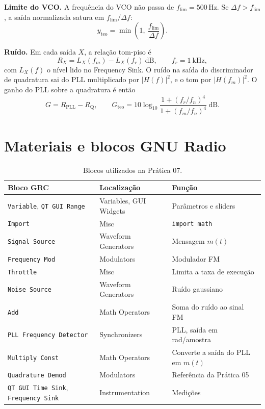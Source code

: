 \documentclass[11pt,a4paper]{article}
\begin{document}
\textbf{Limite do VCO.} A frequência do VCO não passa de
$f_\text{lim} = 500$\,Hz. Se $\Delta f > f_\text{lim}$, a saída normalizada
satura em $f_\text{lim}/\Delta f$:
\begin{equation}
  y_\text{teo} = \min\!\left(1,\ \frac{f_\text{lim}}{\Delta f}\right).
  \label{eq:sat}
\end{equation}

\textbf{Ruído.} Em cada saída $X$, a relação tom-piso é
\begin{equation}
  R_X = L_X(f_m) - L_X(f_r)\ \text{dB}, \qquad f_r = 1\ \text{kHz},
  \label{eq:R}
\end{equation}
com $L_X(f)$ o nível lido no Frequency Sink. O ruído na saída do discriminador
de quadratura sai do PLL multiplicado por $|H(f)|^2$, e o tom por $|H(f_m)|^2$.
O ganho do PLL sobre a quadratura é então
\begin{equation}
  G = R_\text{PLL} - R_\text{Q}, \qquad
  G_\text{teo} = 10\log_{10}\frac{1 + (f_r/f_n)^4}{1 + (f_m/f_n)^4}\ \text{dB}.
  \label{eq:G}
\end{equation}

\section{Materiais e blocos GNU Radio}

\begin{table}[H]
  \centering\small
  \begin{tabular}{l l l}
    \toprule
    \textbf{Bloco GRC} & \textbf{Localização} & \textbf{Função} \\
    \midrule
    \texttt{Variable}, \texttt{QT GUI Range} & Variables, GUI Widgets & Parâmetros e sliders \\
    \texttt{Import}                  & Misc                & \texttt{import math} \\
    \texttt{Signal Source}           & Waveform Generators & Mensagem $m(t)$ \\
    \texttt{Frequency Mod}           & Modulators          & Modulador FM \\
    \texttt{Throttle}                & Misc                & Limita a taxa de execução \\
    \texttt{Noise Source}            & Waveform Generators & Ruído gaussiano \\
    \texttt{Add}                     & Math Operators      & Soma do ruído ao sinal FM \\
    \texttt{PLL Frequency Detector}  & Synchronizers       & PLL, saída em rad/amostra \\
    \texttt{Multiply Const}          & Math Operators      & Converte a saída do PLL em $m(t)$ \\
    \texttt{Quadrature Demod}        & Modulators          & Referência da Prática 05 \\
    \texttt{QT GUI Time Sink}, \texttt{Frequency Sink} & Instrumentation & Medições \\
    \bottomrule
  \end{tabular}
  \caption{Blocos utilizados na Prática 07.}
\end{table}
\end{document}
